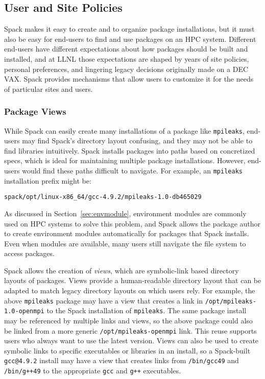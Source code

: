 
\subsection{User and Site Policies}
\label{sec:usecase-policy}

Spack makes it easy to create and to organize package installations,
but it must also be easy for end-users to find and use packages on an HPC
system. Different end-users have different expectations about how packages
should be built and installed, and at LLNL those expectations are shaped
by years of site policies, personal preferences, and lingering legacy
decisions originally made on a DEC VAX.
Spack provides mechanisms that allow users to customize it for the needs
of particular sites and users.


\subsubsection{Package Views}
\label{sec:package-views}

While Spack can easily create many installations of a package like 
{\tt mpileaks}, end-users may find Spack's 
directory layout confusing, and they may not be able to find libraries 
intuitively. Spack installs packages into paths based on concretized specs,
which is ideal for maintaining multiple package installations. However, 
end-users would find these paths difficult to navigate. 
For example, an {\tt mpileaks} installation prefix might be:
%
\begin{verbatim}
spack/opt/linux-x86_64/gcc-4.9.2/mpileaks-1.0-db465029
\end{verbatim}

As discussed in Section~\ref{sec:envmodule},
environment modules are commonly used on HPC systems to solve this problem,
and Spack allows the package author to create environment modules 
automatically for packages that Spack installs.
Even when modules are available, many users still
navigate the file system to access packages.

Spack allows the creation of {\it views}, which are symbolic-link based directory 
layouts of packages. Views provide a human-readable directory layout that
can be adapted to match legacy directory layouts on which users rely. For 
example, the above {\tt mpileaks} package may have a view that creates a link 
in {\tt /opt/mpileaks-1.0-openmpi} to the Spack installation of {\tt mpileaks}.
The same package install may be referenced by multiple links and views,
so the above package could also be linked from a more generic {\tt /opt/mpileaks-openmpi}
link. This reuse supports users who always want to use the latest version.
Views can also be used to create symbolic links to specific executables or libraries in an install,
so a Spack-built {\tt gcc@4.9.2} install may have a view that creates links from
{\tt /bin/gcc49} and {\tt /bin/g++49} to the appropriate {\tt gcc} and {\tt g++} executables.

